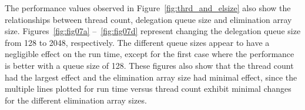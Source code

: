 The performance values observed in Figure~\ref{fig:thrd_and_elsize} also show the relationships between thread count, delegation queue size and elimination array size. Figures~\ref{fig:fig07a} --~\ref{fig:fig07d} represent changing the delegation queue size from 128 to 2048, respectively. The different queue sizes appear to have a negligible effect on the run time, except for the first case where the performance is better with a queue size of 128. These figures also show that the thread count had the largest effect and the elimination array size had minimal effect, since the multiple lines plotted for run time versus thread count exhibit minimal changes for the different elimination array sizes.

\begin{figure}[]
\centering
{}
\\

\end{figure}
